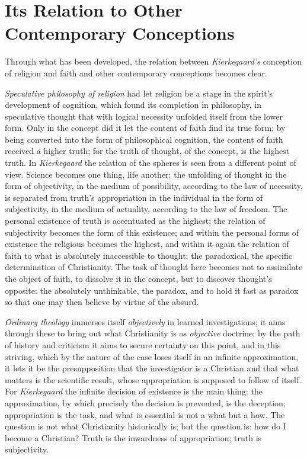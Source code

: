 \documentclass[12pt,a4paper]{book}
\begin{document}
\section{Its Relation to Other Contemporary Conceptions}
\label{sec:contemporary}

Through what has been developed, the relation between \emph{Kierkegaard's}
conception of religion and faith and other contemporary conceptions
becomes clear.

\emph{Speculative philosophy of religion} had let religion be a stage in the
spirit's development of cognition, which found its completion in
philosophy, in speculative thought that with logical necessity unfolded
itself from the lower form. Only in the concept did it let the content
of faith find its true form; by being converted into the form of
philosophical cognition, the content of faith received a higher truth;
for the truth of thought, of the concept, is the highest truth. In
\emph{Kierkegaard} the relation of the spheres is seen from a different point
of view. Science becomes one thing, life another; the unfolding of
thought in the form of objectivity, in the medium of possibility,
according to the law of necessity, is separated from truth's
appropriation in the individual in the form of subjectivity, in the
medium of actuality, according to the law of freedom. The personal
existence of truth is accentuated as the highest; the relation of
subjectivity becomes the form of this existence; and within the personal
forms of existence the religious becomes the highest, and within it
again the relation of faith to what is absolutely inaccessible to
thought: the paradoxical, the specific determination of Christianity.
The task of thought here becomes not to assimilate the object of faith,
to dissolve it in the concept, but to discover thought's opposite: the
absolutely unthinkable, the paradox, and to hold it fast as paradox so
that one may then believe by virtue of the absurd.

\emph{Ordinary theology} immerses itself \emph{objectively} in learned investigations;
it aims through these to bring out what Christianity is as \emph{objective}
doctrine; by the path of history and criticism it aims to secure
certainty on this point, and in this striving, which by the nature of
the case loses itself in an infinite approximation, it lets it be the
presupposition that the investigator is a Christian and that what
matters is the scientific result, whose appropriation is supposed to
follow of itself. For \emph{Kierkegaard} the infinite decision of existence is
the main thing: the approximation, by which precisely the decision is
prevented, is the deception; appropriation is the task, and what is
essential is not a what but a how. The question is not what Christianity
historically is; but the question is: how do I become a Christian? Truth
is the inwardness of appropriation; truth is subjectivity.
\end{document}
